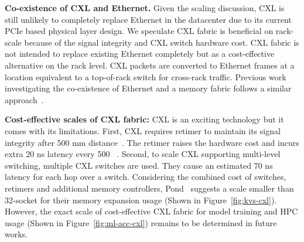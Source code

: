 \noindent \textbf{Co-existence of CXL and Ethernet.}
Given the scaling discussion, CXL is still unlikely to completely replace Ethernet in the datacenter due to its current PCIe based physical layer design. 
%
We speculate CXL fabric is beneficial on rack-scale because of the signal integrity and CXL switch hardware cost. 
%
CXL fabric is not intended to replace existing Ethernet completely but as a cost-effective alternative on the rack level. 
%
CXL packets are converted to Ethernet frames at a location equivalent to a top-of-rack switch for cross-rack traffic.
%
Previous work investigating the co-existence of Ethernet and a memory fabric follows a similar approach~\cite{aquila:nsdi:2022}.

\noindent \textbf{Cost-effective scales of CXL fabric:}
%
CXL is an exciting technology but it comes with its limitations.
%
First, CXL requires retimer to maintain its signal integrity after 500 mm distance~\cite{microchip-cxl-retimer,asteralabs-pcie-retimer}. The retimer raises the hardware cost and incurs extra 20 ns latency every 500 ~\cite{pond:asplos:2023}.
%
Second, to scale CXL supporting multi-level switching, multiple CXL switches are used. They cause an estimated 70 ns latency for each hop over a switch.
%
Considering the combined cost of switches, retimers and additional memory controllers, Pond~\cite{pond-saving:ieee-micro:2023} suggests a
scale smaller than 32-socket for their memory expansion usage (Shown in Figure~\ref{fig:kvs-cxl}).
%
However, the exact scale of cost-effective CXL fabric for model training and HPC usage (Shown in Figure~\ref{fig:ml-acc-cxl}) remains to be determined in future works. 
%

%
%    

